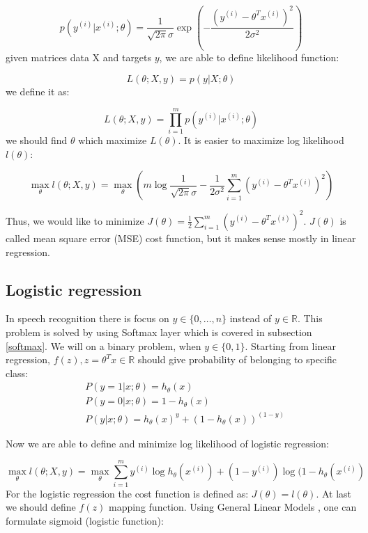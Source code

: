 \begin{equation}
	p(y^{(i)}|x^{(i)};\theta) = \frac {1}{\sqrt{2\pi}\sigma}\exp\left(- \frac{(y^{(i)}-\theta^Tx^{(i)})^2}{2\sigma^2} \right) 
\end{equation}
given matrices data X and targets $y$, we are able to define likelihood function:

\begin{equation}
	L(\theta;X,y) = p(y|X;\theta)
\end{equation}
we define it as:

\begin{equation}
	L(\theta;X,y) = \prod\limits_{i=1}^m p(y^{(i)}|x^{(i)};\theta)
\end{equation}
we should find $\theta$ which maximize $L(\theta)$. It is easier to maximize log likelihood~$l(\theta)$:

\begin{equation}
	\max\limits_{\theta}  l(\theta;X,y) =  \max\limits_\theta \left( m\log{\frac{1}{\sqrt{2\pi}\sigma}} - \frac{1}{2\sigma^2}\sum\limits^{m}_{i=1}(y^{(i)}-\theta^Tx^{(i)})^2 \right)
\end{equation}

Thus, we would like to minimize $J(\theta)=\frac{1}{2}\sum\limits^{m}_{i=1}(y^{(i)}-\theta^Tx^{(i)})^2$. $J(\theta)$ is called mean square error (MSE) cost function, but it makes sense mostly in linear regression.

\subsection{Logistic regression}

In speech recognition there is focus on $y \in \{0,\ldots,n\}$ instead of $y \in \mathbb{R}$. This problem is solved by using Softmax layer which is covered in subsection \ref{softmax}. We will on a binary problem, when $y \in \{0,1\} $. Starting from linear regression, $f(z), z = \theta^Tx \in \mathbb{R}$ should give probability of belonging to specific class:
\begin{align}
	& P(y=1|x;\theta) = h_\theta(x) \\
	& P(y=0|x;\theta) = 1-h_\theta(x) \\
	& P(y|x;\theta) =  h_\theta(x)^y + (1-h_\theta(x))^{(1-y)}
\end{align}

Now we are able to define and minimize log likelihood of logistic regression:  

\begin{equation} 
	\max\limits_\theta l(\theta;X,y) = \max\limits_\theta \sum\limits^{m}_{i=1}y^{(i)}\log{h_\theta(x^{(i)})}+(1-y^{(i)})\log(1-h_\theta(x^{(i)})
\end{equation}
For the logistic regression the cost function is defined as: $J(\theta)=l(\theta)$. At last we should define $f(z)$ mapping function. Using General Linear Models \parencite[p. 26]{ng_cs229_2000}, one  can formulate sigmoid (logistic function):


